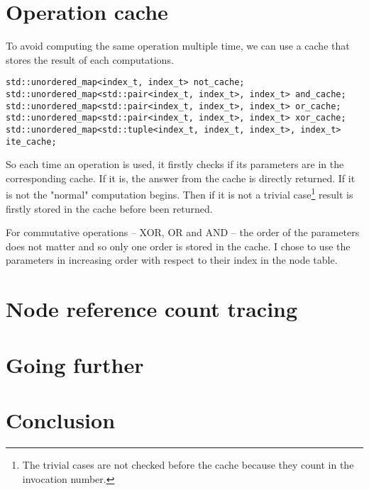 \documentclass[nonacm=true]{acmart}
\begin{document}
\section{Operation cache}
To avoid computing the same operation multiple time, we can use a cache that stores the result of each computations.

\begin{verbatim}
std::unordered_map<index_t, index_t> not_cache;
std::unordered_map<std::pair<index_t, index_t>, index_t> and_cache;
std::unordered_map<std::pair<index_t, index_t>, index_t> or_cache;
std::unordered_map<std::pair<index_t, index_t>, index_t> xor_cache;
std::unordered_map<std::tuple<index_t, index_t, index_t>, index_t> ite_cache;
\end{verbatim}

So each time an operation is used, it firstly checks if its parameters are in the corresponding cache. If it is, the answer from the cache is directly returned. If it is not the "normal" computation begins. Then if it is not a trivial case\footnote{The trivial cases are not checked before the cache because they count in the invocation number.} result is firstly stored in the cache before been returned.

For commutative operations -- XOR, OR and AND -- the order of the parameters does not matter and so only one order is stored in the cache. I chose to use the parameters in increasing order with respect to their index in the node table. 

\section{Node reference count tracing}

\section{Going further}

\section{Conclusion}

\listoftodos{}
\end{document}
